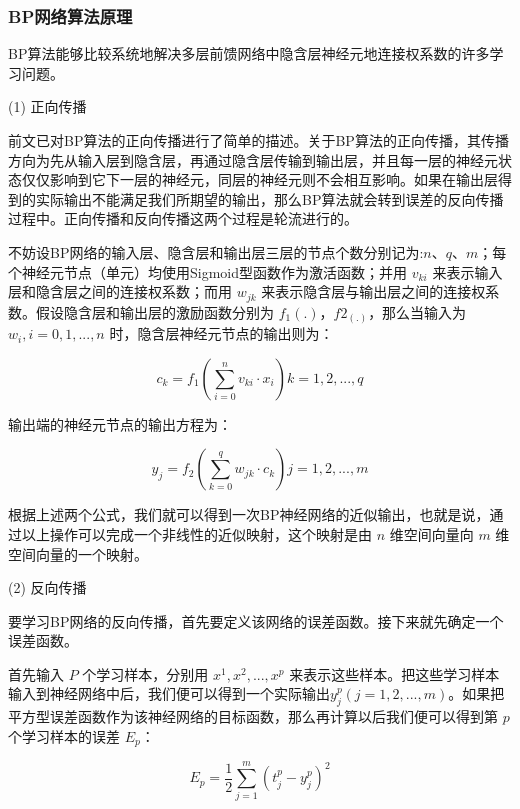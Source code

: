 \documentclass[UTF8]{ctexart}
\begin{document}
\subsubsection{BP网络算法原理}

BP算法能够比较系统地解决多层前馈网络中隐含层神经元地连接权系数的许多学习问题。 \par

(1) 正向传播 \par

前文已对BP算法的正向传播进行了简单的描述。关于BP算法的正向传播，其传播方向为先从输入层到隐含层，再通过隐含层传输到输出层，并且每一层的神经元状态仅仅影响到它下一层的神经元，同层的神经元则不会相互影响。如果在输出层得到的实际输出不能满足我们所期望的输出，那么BP算法就会转到误差的反向传播过程中。正向传播和反向传播这两个过程是轮流进行的。 \par

不妨设BP网络的输入层、隐含层和输出层三层的节点个数分别记为:$n$、$q$、$m$；每个神经元节点（单元）均使用Sigmoid型函数作为激活函数；并用 $v_{ki}$ 来表示输入层和隐含层之间的连接权系数；而用 $w_{jk}$ 来表示隐含层与输出层之间的连接权系数。假设隐含层和输出层的激励函数分别为 $f_1(.)$，$f2_(.)$，那么当输入为 $w_i,i=0,1,...,n$ 时，隐含层神经元节点的输出则为：

\begin{equation} 
c_k = f_1(\sum_{i=0}^{n} v_{ki} \cdot x_i) k = 1,2,...,q
\end{equation}

输出端的神经元节点的输出方程为：

\begin{equation} 
y_j = f_2(\sum_{k=0}^{q} w_{jk} \cdot c_k) j = 1,2,...,m
\end{equation}

根据上述两个公式，我们就可以得到一次BP神经网络的近似输出，也就是说，通过以上操作可以完成一个非线性的近似映射，这个映射是由 $n$ 维空间向量向 $m$ 维空间向量的一个映射。

(2) 反向传播 \par

要学习BP网络的反向传播，首先要定义该网络的误差函数。接下来就先确定一个误差函数。 \par

首先输入 $P$ 个学习样本，分别用 $x^1,x^2,...,x^p$ 来表示这些样本。把这些学习样本输入到神经网络中后，我们便可以得到一个实际输出$y_j^p(j=1,2,...,m)$。如果把平方型误差函数作为该神经网络的目标函数，那么再计算以后我们便可以得到第 $p$ 个学习样本的误差 $E_p$：

\begin{equation} 
E_p=\frac{1}{2} \sum_{j=1}^{m}  (t_{j}^{p} - y_{j}^{p})^2
\end{equation}
\end{document}
